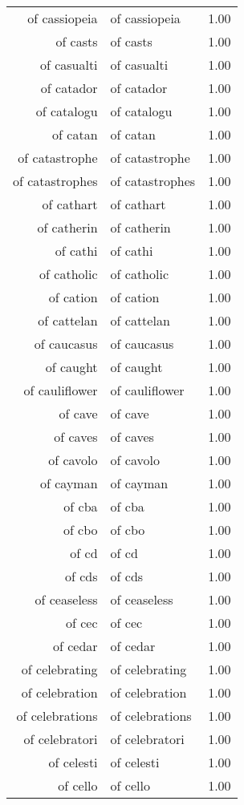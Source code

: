 \begin{table}[ht]
\begin{tabular}{rlr}
  of cassiopeia & of cassiopeia & 1.00 \\ 
  of casts & of casts & 1.00 \\ 
  of casualti & of casualti & 1.00 \\ 
  of catador & of catador & 1.00 \\ 
  of catalogu & of catalogu & 1.00 \\ 
  of catan & of catan & 1.00 \\ 
  of catastrophe & of catastrophe & 1.00 \\ 
  of catastrophes & of catastrophes & 1.00 \\ 
  of cathart & of cathart & 1.00 \\ 
  of catherin & of catherin & 1.00 \\ 
  of cathi & of cathi & 1.00 \\ 
  of catholic & of catholic & 1.00 \\ 
  of cation & of cation & 1.00 \\ 
  of cattelan & of cattelan & 1.00 \\ 
  of caucasus & of caucasus & 1.00 \\ 
  of caught & of caught & 1.00 \\ 
  of cauliflower & of cauliflower & 1.00 \\ 
  of cave & of cave & 1.00 \\ 
  of caves & of caves & 1.00 \\ 
  of cavolo & of cavolo & 1.00 \\ 
  of cayman & of cayman & 1.00 \\ 
  of cba & of cba & 1.00 \\ 
  of cbo & of cbo & 1.00 \\ 
  of cd & of cd & 1.00 \\ 
  of cds & of cds & 1.00 \\ 
  of ceaseless & of ceaseless & 1.00 \\ 
  of cec & of cec & 1.00 \\ 
  of cedar & of cedar & 1.00 \\ 
  of celebrating & of celebrating & 1.00 \\ 
  of celebration & of celebration & 1.00 \\ 
  of celebrations & of celebrations & 1.00 \\ 
  of celebratori & of celebratori & 1.00 \\ 
  of celesti & of celesti & 1.00 \\ 
  of cello & of cello & 1.00 \\ 

\end{tabular}
\end{table}
